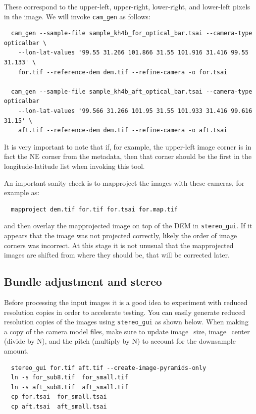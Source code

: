 These correspond to the upper-left, upper-right, lower-right, and lower-left
pixels in the image. We will invoke \texttt{cam\_gen} as follows:

\begin{verbatim}
  cam_gen --sample-file sample_kh4b_for_optical_bar.tsai --camera-type opticalbar \
    --lon-lat-values '99.55 31.266 101.866 31.55 101.916 31.416 99.55 31.133' \
    for.tif --reference-dem dem.tif --refine-camera -o for.tsai

  cam_gen --sample-file sample_kh4b_aft_optical_bar.tsai --camera-type opticalbar
    --lon-lat-values '99.566 31.266 101.95 31.55 101.933 31.416 99.616 31.15' \
    aft.tif --reference-dem dem.tif --refine-camera -o aft.tsai
\end{verbatim}

It is very important to note that if, for example, the upper-left image
corner is in fact the NE corner from the metadata, then that corner 
should be the first in the longitude-latitude list when invoking this tool.

An important sanity check is to mapproject the images with these
cameras, for example as:

\begin{verbatim}
  mapproject dem.tif for.tif for.tsai for.map.tif
\end{verbatim}

and then overlay the mapprojected image on top of the DEM in \texttt{stereo\_gui}.
If it appears that the image was not projected correctly, likely 
the order of image corners was incorrect. At this stage it is not unusual
that the mapprojected images are shifted from where they should be, that
will be corrected later. 

\subsection{Bundle adjustment and stereo}

Before processing the input images it is a good idea to experiment with
reduced resolution copies in order to accelerate testing.  You can easily
generate reduced resolution copies of the images using \texttt{stereo\_gui}
as shown below.  When making a copy of the camera model files, make sure to
update image\_size, image\_center (divide by N), and the pitch (multiply by N)
to account for the downsample amount.

\begin{verbatim}
  stereo_gui for.tif aft.tif --create-image-pyramids-only
  ln -s for_sub8.tif  for_small.tif
  ln -s aft_sub8.tif  aft_small.tif
  cp for.tsai  for_small.tsai
  cp aft.tsai  aft_small.tsai
\end{verbatim}

